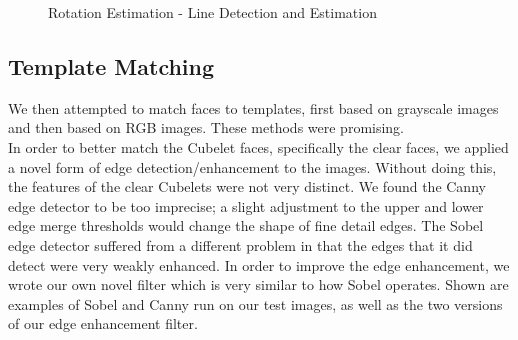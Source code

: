 \documentclass[conference]{IEEEtran}
\begin{document}
\begin{figure}[!h]
\centerline{
\label{fig_first_case}
\hfil
{}}
\caption{Rotation Estimation - Line Detection and Estimation}
\label{fig_sim}
\end{figure} 

\subsection{Template Matching}

We then attempted to match faces to templates, first based on grayscale images and then based on RGB images. These methods were promising.\\

In order to better match the Cubelet faces, specifically the clear faces, we applied a novel form of edge detection/enhancement to the images. Without doing this, the features of the clear Cubelets were not very distinct.  We found the Canny edge detector \cite{Canny} to be too imprecise; a slight adjustment to the upper and lower edge merge thresholds would change the shape of fine detail edges. The Sobel edge detector \cite{Sobel} suffered from a different problem in that the edges that it did detect were very weakly enhanced.  In order to improve the edge enhancement, we  wrote our own novel filter which is very similar to how Sobel operates.  Shown are examples of Sobel and Canny run on our test images, as well as the two versions of our edge enhancement filter.  \\
\end{document}
